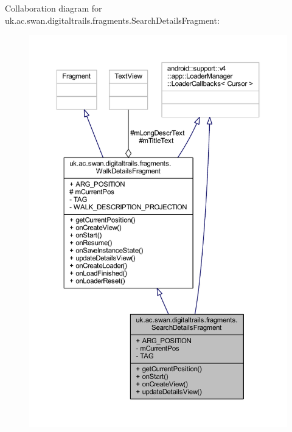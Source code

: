 Collaboration diagram for uk.\+ac.\+swan.\+digitaltrails.\+fragments.\+Search\+Details\+Fragment\+:
\nopagebreak
\begin{figure}[H]
\begin{center}
\leavevmode
\includegraphics[width=350pt]{classuk_1_1ac_1_1swan_1_1digitaltrails_1_1fragments_1_1_search_details_fragment__coll__graph}
\end{center}
\end{figure}
